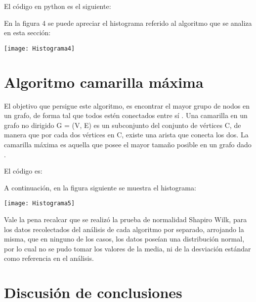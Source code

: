\documentclass[10pt,a4paper]{article}
\begin{document}
El código en python es el siguiente:



En la figura 4 se puede apreciar el histograma referido al algoritmo que se analiza en esta sección:

\begin{center}

\texttt{[image: Histograma4]}

\end{center}  

\section{Algoritmo camarilla máxima}

El objetivo que persigue este algoritmo, es encontrar el mayor grupo de nodos en un grafo, de forma tal que todos estén conectados entre sí \cite{a5}. Una camarilla en un grafo no dirigido G = (V, E) es un subconjunto del conjunto de vértices C, de manera que por cada dos vértices en C, existe una arista que conecta los dos. La camarilla máxima es aquella que posee el mayor tamaño posible en un grafo dado \cite{a9}.\vspace{.4cm}

El código es:



A continuación, en la figura siguiente se muestra el histograma:

\begin{center}

\texttt{[image: Histograma5]}

\end{center}

Vale la pena recalcar que se realizó la prueba de normalidad Shapiro Wilk, para los datos recolectados del análisis de cada algoritmo por separado, arrojando la misma, que en ninguno de los casos, los datos poseían una distribución normal, por lo cual no se pudo tomar los valores de la media, ni de la desviación estándar como referencia en el análisis. 

\section{Discusión de conclusiones}
\end{document}
